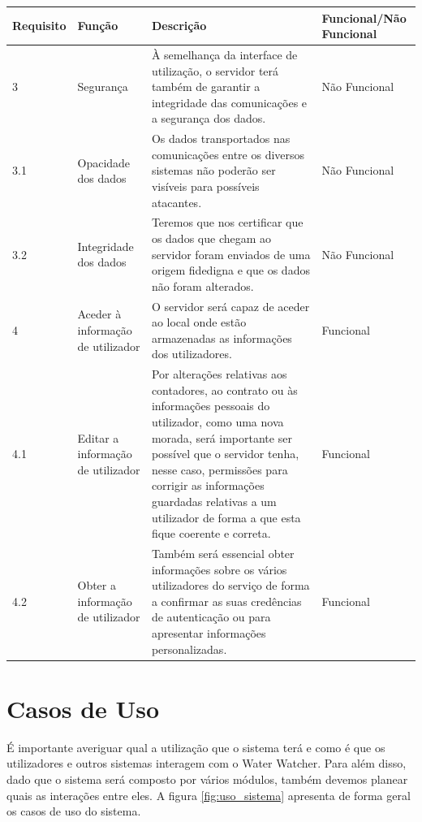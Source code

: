 \begin{center}
\begin{tabular}[c]{||p{1.5cm} | p{2.6cm} | p{6cm} | p{2.5cm}||} 
\hline
Requisito & Função & Descrição & Funcional/Não Funcional\\ %
\hline\hline
3 & Segurança & À semelhança da interface de utilização, o servidor terá também de garantir a integridade das comunicações e a segurança dos dados. & Não Funcional\\ 
\hline
3.1 & Opacidade dos dados & Os dados transportados nas comunicações entre os diversos sistemas não poderão ser visíveis para possíveis atacantes. & Não Funcional\\
\hline
3.2 & Integridade dos dados & Teremos que nos certificar que os dados que chegam ao servidor foram enviados de uma origem fidedigna e que os dados não foram alterados. & Não Funcional\\
\hline\hline
4 & Aceder à informação de utilizador & O servidor será capaz de aceder ao local onde estão armazenadas as informações dos utilizadores. & Funcional\\ 
\hline
4.1 & Editar a informação de utilizador &Por alterações relativas aos contadores, ao contrato ou às informações pessoais do utilizador, como uma nova morada, será importante ser possível que o servidor tenha, nesse caso, permissões para corrigir as informações guardadas relativas a um utilizador de forma a que esta fique coerente e correta. & Funcional\\
\hline
4.2 & Obter a informação de utilizador & Também será essencial obter informações sobre os vários utilizadores do serviço de forma a confirmar as suas credências de autenticação ou para apresentar informações personalizadas. & Funcional\\
\hline
\end{tabular}
\label{tab:req_serv}
\end{center}


\section{Casos de Uso} \label{sec:casos_uso}
É importante averiguar qual a utilização que o sistema terá e como é que os utilizadores e outros sistemas interagem com o Water Watcher. Para além disso, dado que o sistema será composto por vários módulos, também devemos planear quais as interações entre eles. A figura \ref{fig:uso_sistema} apresenta de forma geral os casos de uso do sistema.

